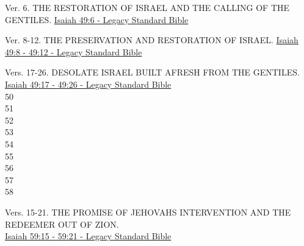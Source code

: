 \documentclass[
  ignorenonframetext,
]{beamer}
\begin{document}
\begin{frame}{49}
\label{section-66}
\begin{block}{Ver. 6. THE RESTORATION OF ISRAEL AND THE CALLING OF THE
GENTILES.}
\label{ver.-6.-the-restoration-of-israel-and-the-calling-of-the-gentiles.}
\href{https://read.lsbible.org/?q=isa49\%3A6}{Isaiah 49:6 - Legacy
Standard Bible}
\end{block}

\begin{block}{Ver. 8-12. THE PRESERVATION AND RESTORATION OF ISRAEL.}
\label{ver.-8-12.-the-preservation-and-restoration-of-israel.}
\href{https://read.lsbible.org/?q=isa49\%3A8-12}{Isaiah 49:8 - 49:12 -
Legacy Standard Bible}
\end{block}

\begin{block}{Vers. 17-26. DESOLATE ISRAEL BUILT AFRESH FROM THE
GENTILES.}
\label{vers.-17-26.-desolate-israel-built-afresh-from-the-gentiles.}
\href{https://read.lsbible.org/?q=isa49\%3A17-26}{Isaiah 49:17 - 49:26 -
Legacy Standard Bible}\\
50\\
51\\
52\\
53\\
54\\
55\\
56\\
57\\
58
\end{block}
\end{frame}

\begin{frame}{59}
\label{section-67}
Vers. 15-21. THE PROMISE OF JEHOVAH\textquotesingle S INTERVENTION AND
THE REDEEMER OUT OF ZION.\\
\href{https://read.lsbible.org/?q=isa59\%3A15-21}{Isaiah 59:15 - 59:21 -
Legacy Standard Bible}
\end{frame}
\end{document}
